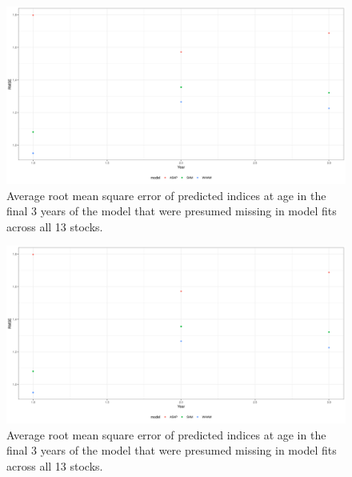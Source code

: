 \documentclass[12pt,letterpaper, leqno]{article}
\begin{document}
\begin{landscape}
\begin{figure}
\caption{Average root mean square error of predicted indices at age in the final 3 years of the model that were presumed missing in model fits across all 13 stocks.}\label{predmissing_avgrmseplot}
\begin{center}
\includegraphics[height = 0.8\textheight]{../db/predmissing_avgrmseplot.png}
\end{center}
\end{figure}

\begin{figure}
\caption{Average root mean square error of predicted indices at age in the final 3 years of the model that were presumed missing in model fits across all 13 stocks.}\label{predmissing_avgrmseplot}
\begin{center}
\includegraphics[height = 0.8\textheight]{../db/predmissing_avgrmseplot.png}
\end{center}
\end{figure}


\end{landscape}
\end{document}
